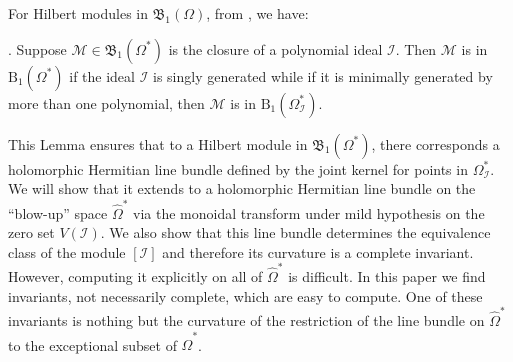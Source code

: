 \documentclass[11pt]{amsart}
\theoremstyle{definition}
\numberwithin{equation}{section}
\begin{document}
For Hilbert modules in $\mathfrak{B}_1(\Omega)$, from \cite{bmp}, we have:

.
Suppose $\mathcal M \in \mathfrak B_1(\Omega^*)$ is the closure of a
polynomial ideal $\mathcal I$.  Then $\mathcal M$ is in
$\mathrm{B}_1(\Omega^*)$ if the ideal  $\mathcal I$ is singly
generated while if it is minimally generated by more than one polynomial, then $\mathcal M$ is in $\mathrm{B}_1(\Omega_{\mathcal I}^*)$.

This Lemma ensures that to a Hilbert module in
$\mathfrak B_1(\Omega^*)$, there corresponds a holomorphic Hermitian line
bundle defined by the joint kernel for points in $\Omega_\mathcal I^*$. We will show that it extends to a holomorphic Hermitian line bundle on the ``blow-up'' space $\hat{\Omega}^*$ via the monoidal transform under mild hypothesis on the zero set $V(\mathcal I)$.  We also show that this line bundle determines the equivalence class of the module $[\mathcal I]$ and therefore its curvature is a complete invariant. However, computing it explicitly on all of $\hat{\Omega}^*$ is difficult.
In this paper we find invariants, not necessarily complete, which are  easy to compute. One of these invariants is nothing but the curvature of the restriction of the line bundle on $\hat\Omega^*$ to the exceptional subset of $\hat{\Omega}^*$.
\end{document}
